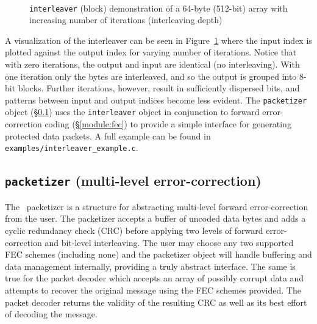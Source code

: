 \begin{figure}
\centering
\mbox{
   \quad
   \quad
}
\mbox{
   \quad
   \quad
}
\mbox{
   \quad
}
\caption{{\tt interleaver} (block) demonstration of a 64-byte (512-bit) array
with increasing number of iterations (interleaving depth)}
\label{fig:module:fec:interleaver:scatterplot}
\end{figure}
%
A visualization of the interleaver can be seen in
Figure~\ref{fig:module:fec:interleaver:scatterplot}
where the input index is plotted against the output index for varying number
of iterations.
Notice that with zero iterations, the output and input are identical (no
interleaving).
With one iteration only the bytes are interleaved, and so the output is
grouped into 8-bit blocks.
Further iterations, however, result in sufficiently dispersed bits, and
patterns between input and output indices become less evident.
%
The {\tt packetizer} object (\S\ref{module:fec:packetizer}) uses the
{\tt interleaver} object in conjunction to forward error-correction coding
(\S\ref{module:fec}) to provide a simple interface for generating
protected data packets.
A full example can be found in {\tt examples/interleaver\_example.c}.


%
%
\subsection{{\tt packetizer} (multi-level error-correction)}
\label{module:fec:packetizer}
The \liquid\ packetizer is a structure for abstracting multi-level forward
error-correction from the user.
The packetizer accepts a buffer of uncoded data bytes and adds a
cyclic redundancy check (CRC) before applying two levels of forward
error-correction and bit-level interleaving.
The user may choose any two supported FEC schemes (including none) and the
packetizer object will handle buffering and data management internally,
providing a truly abstract interface.
The same is true for the packet decoder which accepts an array
of possibly corrupt data and attempts to recover the original message using
the FEC schemes provided.
The packet decoder returns the validity of the resulting CRC as well as its
best effort of decoding the message.

